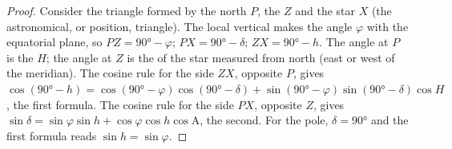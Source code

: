 \begin{proof}
Consider the triangle formed by the north  $P$, the  $Z$
and the star $X$ (the astronomical, or position, triangle). The local
vertical makes the angle $\varphi$ with the equatorial plane, so $PZ =
\ang{90} - \varphi$; $PX = \ang{90} - \delta$; $ZX = \ang{90} - h$. The angle
at $P$ is the  $H$; the angle at $Z$ is the  of the star
measured from north (east or west of the meridian). The cosine rule for the
side $ZX$, opposite $P$, gives
$\cos(\ang{90} - h) = \cos(\ang{90} - \varphi)\cos(\ang{90} - \delta) +
\sin(\ang{90} - \varphi)\sin(\ang{90} - \delta)\cos H$, the first formula.
The cosine rule for the side $PX$, opposite $Z$, gives
$\sin\delta = \sin\varphi\sin h + \cos\varphi\cos h\cos\mathrm{A}$, the
second. For the pole, $\delta = \ang{90}$ and the first formula reads
$\sin h = \sin\varphi$.
\end{proof}


